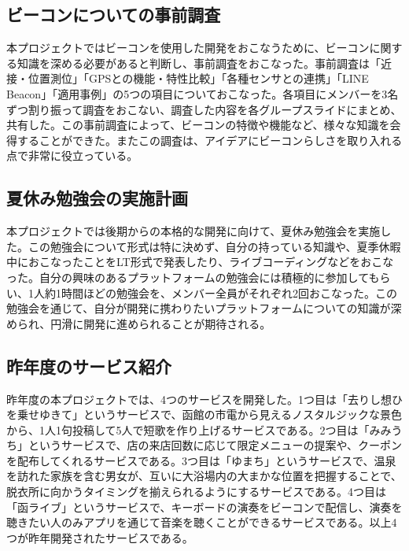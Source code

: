 
\subsection{ビーコンについての事前調査}
本プロジェクトではビーコンを使用した開発をおこなうために、ビーコンに関する知識を深める必要があると判断し、事前調査をおこなった。事前調査は「近接・位置測位」「GPSとの機能・特性比較」「各種センサとの連携」「LINE Beacon」「適用事例」の5つの項目についておこなった。各項目にメンバーを3名ずつ割り振って調査をおこない、調査した内容を各グループスライドにまとめ、共有した。この事前調査によって、ビーコンの特徴や機能など、様々な知識を会得することができた。またこの調査は、アイデアにビーコンらしさを取り入れる点で非常に役立っている。

\subsection{夏休み勉強会の実施計画}
本プロジェクトでは後期からの本格的な開発に向けて、夏休み勉強会を実施した。この勉強会について形式は特に決めず、自分の持っている知識や、夏季休暇中におこなったことをLT形式で発表したり、ライブコーディングなどをおこなった。自分の興味のあるプラットフォームの勉強会には積極的に参加してもらい、1人約1時間ほどの勉強会を、メンバー全員がそれぞれ2回おこなった。この勉強会を通じて、自分が開発に携わりたいプラットフォームについての知識が深められ、円滑に開発に進められることが期待される。

\subsection{昨年度のサービス紹介}
昨年度の本プロジェクトでは、4つのサービスを開発した。1つ目は「去りし想ひを乗せゆきて」というサービスで、函館の市電から見えるノスタルジックな景色から、1人1句投稿して5人で短歌を作り上げるサービスである。2つ目は「みみうち」というサービスで、店の来店回数に応じて限定メニューの提案や、クーポンを配布してくれるサービスである。3つ目は「ゆまち」というサービスで、温泉を訪れた家族を含む男女が、互いに大浴場内の大まかな位置を把握することで、脱衣所に向かうタイミングを揃えられるようにするサービスである。4つ目は「函ライブ」というサービスで、キーボードの演奏をビーコンで配信し、演奏を聴きたい人のみアプリを通じて音楽を聴くことができるサービスである。以上4つが昨年開発されたサービスである。
